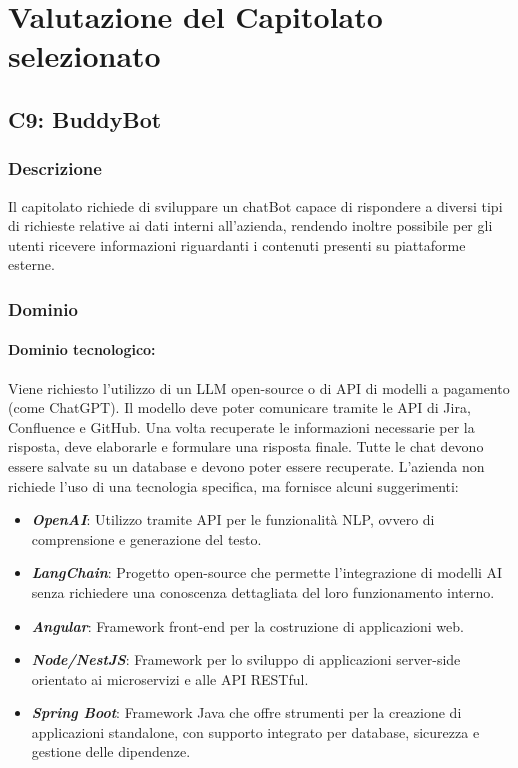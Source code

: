 \section{Valutazione del Capitolato selezionato}

\subsection{C9: BuddyBot}

\subsubsection{Descrizione}
Il capitolato richiede di sviluppare un chatBot capace di rispondere
a diversi tipi di richieste relative ai dati interni all'azienda, 
rendendo inoltre possibile per gli utenti ricevere informazioni riguardanti 
i contenuti presenti su piattaforme esterne.

\subsubsection{Dominio}
\paragraph{Dominio tecnologico:}
Viene richiesto l'utilizzo di un LLM open-source o di API di modelli 
a pagamento (come ChatGPT). Il modello deve poter comunicare tramite le API di Jira, 
Confluence e GitHub. Una volta recuperate le informazioni necessarie per la risposta,
deve elaborarle e formulare una risposta finale. Tutte le chat devono essere
salvate su un database e devono poter essere recuperate. L'azienda non richiede
l'uso di una tecnologia specifica, ma fornisce alcuni suggerimenti:
\begin{itemize}
    \item \textit{\textbf{OpenAI}}: Utilizzo tramite API per le funzionalità NLP, ovvero di comprensione e generazione del testo.
    \item \textit{\textbf{LangChain}}: Progetto open-source che permette l'integrazione di modelli AI senza richiedere una conoscenza dettagliata del loro funzionamento interno.
    \item \textit{\textbf{Angular}}: Framework front-end per la costruzione di applicazioni web.
    \item \textit{\textbf{Node/NestJS}}: Framework per lo sviluppo di applicazioni server-side orientato ai microservizi e alle API RESTful.
    \item \textit{\textbf{Spring Boot}}: Framework Java che offre strumenti per la creazione di applicazioni standalone, con supporto integrato per database, sicurezza e gestione delle dipendenze.
\end{itemize}


